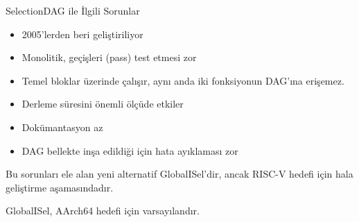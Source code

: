 \begin{frame}{SelectionDAG ile İlgili Sorunlar}
    \begin{itemize}
        \item 2005'lerden beri geliştiriliyor
        \item Monolitik, geçişleri (pass) test etmesi zor
        \item Temel bloklar üzerinde çalışır, aynı anda iki fonksiyonun DAG'ına erişemez.
        \item Derleme süresini önemli ölçüde etkiler
        \item Dokümantasyon az
        \item DAG bellekte inşa edildiği için hata ayıklaması zor
    \end{itemize}
    Bu sorunları ele alan yeni alternatif GlobalISel'dir, ancak RISC-V hedefi için hala geliştirme aşamasındadır.

    GlobalISel, AArch64 hedefi için varsayılandır.
\end{frame}

